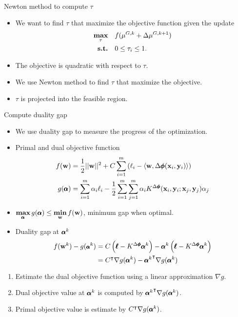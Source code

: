 \documentclass[first=dgreen,second=purple,logo=yellowexc]{aaltoslides}
\begin{document}
\begin{frame}{Newton method to compute $\tau$}
	\begin{itemize}\footnotesize
		\item We want to find $\tau$ that maximize the objective function given the update
		\begin{align*}
			\underset{\tau}{\textbf{max}} & \quad f(\mathbf {\mu}^{G,k} + \Delta{\mathbf {\mu}}^{G,k+1})\\
			\textbf{s.t.} & \quad 0\le\tau_i\le1.
		\end{align*}
		\item The objective is quadratic with respect to $\tau$.
		\item We use Newton method to find $\tau$ that maximize the objective.
		\item $\tau$ is projected into the feasible region.
	\end{itemize}
\end{frame}


\begin{frame}{Compute duality gap}
	\begin{itemize}\footnotesize
		\item We use duality gap to measure the progress of the optimization.
		\item Primal and dual objective function
		\begin{align*}\footnotesize
			f(\mathbf {w}) &= \frac{1}{2}||\mathbf {w}||^2 + C\sum_{i=1}^m\left(\ell_i-\langle \mathbf {w}, \Delta\pmb \phi(\mathbf {x}_i,\mathbf {y}_i) \rangle\right)\\
			g(\pmb {\alpha}) &= \sum_{i=1}^m\alpha_i\ell_i - \frac{1}{2}\sum_{i=1}^m\sum_{j=1}^m\alpha_iK^{\Delta\pmb \phi}(\mathbf {x}_i,\mathbf {y}_i;\mathbf {x}_j,\mathbf {y}_j)\alpha_j
		\end{align*}
		\item $\underset{\pmb {\alpha}}{\textbf{max}}\,g(\pmb {\alpha})\le \underset{\mathbf {w}}{\textbf{min}}\,f(\mathbf {w})$, minimum gap when optimal.
		\item Duality gap at $\pmb {\alpha}^k$
		\begin{align*}\footnotesize
			f(\mathbf {w}^k) - g(\pmb {\alpha}^k) &= C\left(\pmb {\ell}-K^{\Delta\pmb \phi}\pmb {\alpha}^k\right) - \pmb {\alpha}^k\left(\pmb {\ell}-K^{\Delta\pmb \phi}\pmb {\alpha}^k\right)\\
			&= C^{\intercal} \nabla g(\pmb {\alpha}^k) -{\pmb {\alpha}^k} ^{\intercal} \nabla g(\pmb {\alpha}^k)
		\end{align*}
	\end{itemize}
		\begin{enumerate}\footnotesize
			\item Estimate the dual objective function using a linear approximation $\nabla g$.
			\item Dual objective value at $\pmb {\alpha}^k$ is computed by ${\pmb {\alpha}^k} ^{\intercal} \nabla g(\pmb {\alpha}^k)$.
			\item Primal objective value is estimate by $C^{\intercal} \nabla g(\pmb {\alpha}^k)$.
		\end{enumerate}
\end{frame}
\end{document}

